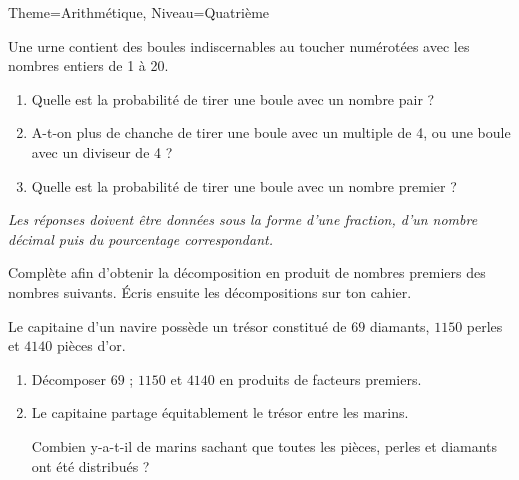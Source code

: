 \documentclass[11pt]{article}
\begin{document}
\begin{multicols}{2}
\begin{Maquette}[Fiche]{Theme=Arithmétique, Niveau=Quatrième}
\begin{exercice}
    Une urne contient des boules indiscernables au toucher numérotées avec les nombres entiers de 1 à 20.
    \begin{center}
        \SchemaProba[%
        ListeNombres={1,2,3,4,5,6,7,8,9,10,11,12,13,14,15,16,17,18,19,20},
        Echelle=0.75,
        Pas=6,
        Repartition={1,1,1,1,1,1,1,1,1,1,1,1,1,1,1,1,1,1,1,1}]
    \end{center}
    \begin{enumerate}
        \item Quelle est la probabilité de tirer une boule avec un nombre pair ?
        \item A-t-on plus de chanche de tirer une boule avec un multiple de 4, ou une boule avec un diviseur de 4 ?
        \item Quelle est la probabilité de tirer une boule avec un nombre premier ?
    \end{enumerate}
    \emph{Les réponses doivent être données sous la forme d’une fraction, d’un nombre décimal puis du pourcentage correspondant.}
\end{exercice}


\begin{exercice}
    Complète afin d’obtenir la décomposition en produit de nombres premiers des nombres suivants. Écris ensuite les décompositions sur ton cahier.
    \begin{multicols}{3}
    \end{multicols}
    \begin{multicols}{3}
    \end{multicols}
\end{exercice}

\begin{exercice}
    Le capitaine d'un navire possède un trésor constitué de $69$ diamants, $1150$ perles et $4140$ pièces d'or.

    \smallskip

    \begin{enumerate}
    \item Décomposer $69$ ; $1150$ et $4140$ en produits de facteurs premiers.
    \item Le capitaine partage équitablement le trésor entre les marins.

    Combien y-a-t-il de marins sachant que toutes les pièces, perles et diamants ont été distribués ?
    \end{enumerate}
\end{exercice}
\end{Maquette}

\end{multicols}
\end{document}
